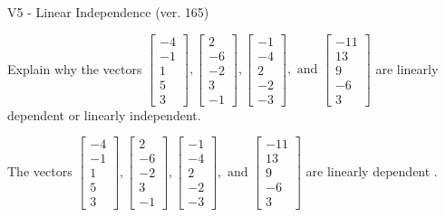 \begin{exercise}
  \begin{exerciseTitle}V5 - Linear Independence (ver. 165)\end{exerciseTitle}
  \begin{exerciseStatement}
    Explain why the vectors \(\left[\begin{array}{r}
-4 \\
-1 \\
1 \\
5 \\
3
\end{array}\right] , \left[\begin{array}{r}
2 \\
-6 \\
-2 \\
3 \\
-1
\end{array}\right] , \left[\begin{array}{r}
-1 \\
-4 \\
2 \\
-2 \\
-3
\end{array}\right] , \text{ and } \left[\begin{array}{r}
-11 \\
13 \\
9 \\
-6 \\
3
\end{array}\right]\) are linearly dependent or linearly independent.	


  \end{exerciseStatement}
  \begin{exerciseAnswer}
   The vectors \(\left[\begin{array}{r}
-4 \\
-1 \\
1 \\
5 \\
3
\end{array}\right] , \left[\begin{array}{r}
2 \\
-6 \\
-2 \\
3 \\
-1
\end{array}\right] , \left[\begin{array}{r}
-1 \\
-4 \\
2 \\
-2 \\
-3
\end{array}\right] , \text{ and } \left[\begin{array}{r}
-11 \\
13 \\
9 \\
-6 \\
3
\end{array}\right]\) are 
  	 linearly dependent  .
  


  \end{exerciseAnswer}
\end{exercise}